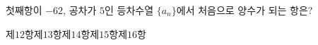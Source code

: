 첫째항이 $-62$, 공차가 $5$인 등차수열 $\{a_n\}$에서 처음으로 양수가 되는 항은?
\begin{choices32}{제$12$항}{제$13$항}{제$14$항}{제$15$항}{제$16$항}\end{choices32}
